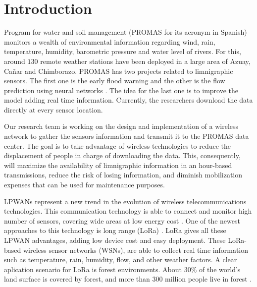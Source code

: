 \section{Introduction}
\label{intro}

Program for water and soil management (PROMAS for its acronym in Spanish) monitors a wealth of environmental information regarding wind, rain, temperature, humidity, barometric pressure and water level of rivers. For this, around $130$ remote weather stations have been deployed in a large area of Azuay, Cañar and Chimborazo. PROMAS has two projects related to limnigraphic sensors. The first one is the early flood warning and the other is the flow prediction using neural networks \cite{felipeartificial}. The idea for the last one is to improve the model adding real time information. Currently, the researchers download the data directly at every sensor location.

Our research team is working on the design and implementation of a wireless network to gather the sensors information and transmit it to the PROMAS data center. The goal is to take advantage of wireless technologies to reduce the displacement of people in charge of downloading the data. This, consequently, will maximize the availability of limnigraphic information in an hour-based transmissions, reduce the risk of losing information, and diminish mobilization expenses that can be used for maintenance purposes.

LPWANs represent a new trend in the evolution of wireless telecommunications technologies. This communication technology is able to connect and monitor high number of sensors, covering wide areas at low energy cost \cite{Augustin2016}. One of the newest approaches to this technology is long range (LoRa) \cite{Semtech2015}. LoRa gives all these LPWAN advantages, adding low device cost and easy deployment. These LoRa-based wireless sensor networks (WSNs), are able to collect real time information such as temperature, rain, humidity, flow, and other weather factors. A clear aplication scenario for LoRa is forest environments. About $30\%$ of the world's land surface is covered by forest, and more than $300$ million people live in forest \cite{wwf2016}.


